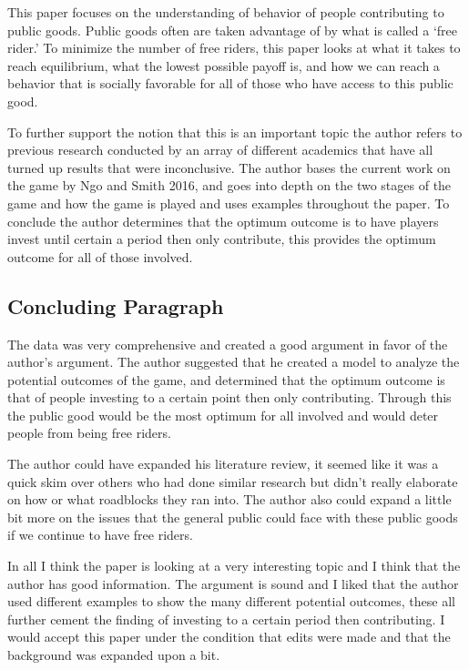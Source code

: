 \documentclass{article}
\newenvironment{itpars}
	{\par\itshape}
	{\par}
\begin{document}
			\begin{itpars}

				This paper focuses on the understanding of behavior of people contributing to public goods. Public goods often are taken advantage of by what is called a ‘free rider.' To minimize the number of free riders, this paper looks at what it takes to reach equilibrium, what the lowest possible payoff is, and how we can reach a behavior that is socially favorable for all of those who have access to this public good.

				To further support the notion that this is an important topic the author refers to previous research conducted by an array of different academics that have all turned up results that were inconclusive. The author bases the current work on the game by Ngo and Smith 2016, and goes into depth on the two stages of the game and how the game is played and uses examples throughout the paper. To conclude the author determines that the optimum outcome is to have players invest until certain a period then only contribute, this provides the optimum outcome for all of those involved.

			\end{itpars}

		\subsection*{Concluding Paragraph}

			\begin{itpars}
			
				The data was very comprehensive and created a good argument in favor of the author's argument. The author suggested that he created a model to analyze the potential outcomes of the game, and determined that the optimum outcome is that of people investing to a certain point then only contributing. Through this the public good would be the most optimum for all involved and would deter people from being free riders.

				The author could have expanded his literature review, it seemed like it was a quick skim over others who had done similar research but didn't really elaborate on how or what roadblocks they ran into. The author also could expand a little bit more on the issues that the general public could face with these public goods if we continue to have free riders.
				
				In all I think the paper is looking at a very interesting topic and I think that the author has good information. The argument is sound and I liked that the author used different examples to show the many different potential outcomes, these all further cement the finding of investing to a certain period then contributing. I would accept this paper under the condition that edits were made and that the background was expanded upon a bit.

			\end{itpars}
\end{document}
